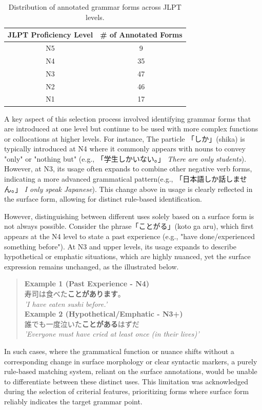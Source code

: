 \begin{table}[h!]
\centering
\begin{tabular}{cc}
\hline \textbf{JLPT Proficiency Level} & \textbf{\# of Annotated Forms} \\ \hline
N5 & 9 \\
N4  & 35 \\
N3 & 47\\
N2 & 46 \\
N1 & 17 \\
\hline
\end{tabular}
\caption[Table of Annotated Grammar forms across JLPT levels]{Distribution of annotated grammar forms across JLPT levels. }
\label{tab:CF-Counts}
\end{table}


A key aspect of this selection process involved identifying grammar forms that are introduced at one level but continue
to be used with more complex functions or collocations at higher levels. For instance, The particle 「しか」(shika) is
typically
introduced at N4 where it commonly appears with nouns to convey "only" or "nothing but" (e.g., 「学生しかいない。」
\textit{There are only students}). However, at N3, its usage often expands to combine other negative verb forms,
indicating a more advanced grammatical pattern(e.g., 「日本語しか話しません。」 \textit{I only speak Japanese}). This
change above in
usage is
clearly
reflected in the
surface
form, allowing for distinct rule-based identification.

However, distinguishing between different uses solely based on a surface form is not always possible. Consider the
phrase「ことがる」(koto ga aru),
which
first
appears at the N4 level to state a past experience (e.g., "have done/experienced something before"). At N3 and upper
levels, its usage expands to describe hypothetical or emphatic situations, which are highly nuanced, yet the surface
expression remains unchanged, as the illustrated below.

\begin{quote}
\textbf{Example 1 (Past Experience - N4)}\\
寿司は食べた\textbf{ことがあります}。\\
\textit{'I have eaten sushi before.'}\\
\textbf{Example 2 (Hypothetical/Emphatic - N3+)}\\
誰でも一度泣いた\textbf{ことがある}はずだ\\
\textit{'Everyone must have cried at least once (in their lives)'}\\
\end{quote}
In such cases, where the grammatical function or nuance shifts without a corresponding change in surface morphology
or clear syntactic markers, a purely rule-based matching system, reliant on the surface annotations, would be unable to
differentiate between these distinct uses. This limitation was acknowledged during the
selection of criterial features, prioritizing forms where surface form reliably indicates the target grammar point.

